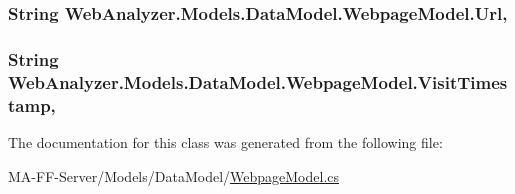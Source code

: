 \subsubsection[{Url}]{\setlength{\rightskip}{0pt plus 5cm}String Web\+Analyzer.\+Models.\+Data\+Model.\+Webpage\+Model.\+Url\hspace{0.3cm}{\ttfamily [get]}, {\ttfamily [set]}}\label{class_web_analyzer_1_1_models_1_1_data_model_1_1_webpage_model_a956b067ed12f422f646b7e2a4b6bb42d}
\hypertarget{class_web_analyzer_1_1_models_1_1_data_model_1_1_webpage_model_ac3378fdc78273706547ec3a9d377ef9a}{}
\subsubsection[{Visit\+Timestamp}]{\setlength{\rightskip}{0pt plus 5cm}String Web\+Analyzer.\+Models.\+Data\+Model.\+Webpage\+Model.\+Visit\+Timestamp\hspace{0.3cm}{\ttfamily [get]}, {\ttfamily [set]}}\label{class_web_analyzer_1_1_models_1_1_data_model_1_1_webpage_model_ac3378fdc78273706547ec3a9d377ef9a}


The documentation for this class was generated from the following file\+:\begin{DoxyCompactItemize}
\item 
M\+A-\/\+F\+F-\/\+Server/\+Models/\+Data\+Model/\hyperlink{_webpage_model_8cs}{Webpage\+Model.\+cs}\end{DoxyCompactItemize}
